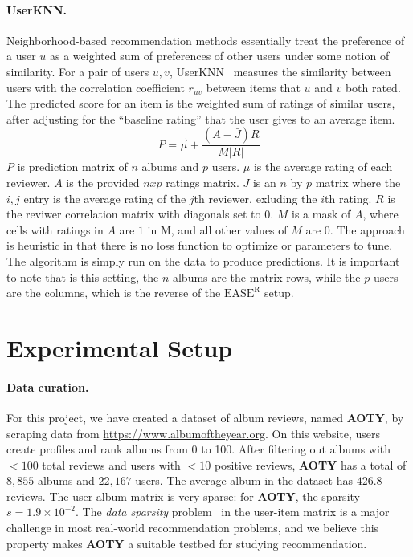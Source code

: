 \documentclass{article}
\newcommand{\aoty}{{\bf AOTY}\xspace}
\newcommand{\card}[1]{\ensuremath{\lvert {#1} \rvert}}
\newcommand{\easer}{$\text{EASE}^\text{R}$}
\newcommand{\userknn}{UserKNN\xspace}
\begin{document}
\paragraph*{\userknn.}
Neighborhood-based recommendation methods essentially treat the preference of a
 user $u$ as a weighted sum of preferences of other users under some notion of
 similarity.
For a pair of users $u, v$,
 \userknn~\citep{resnickGroupLensOpenArchitecture1994} measures the similarity
 between users with the correlation coefficient $r_{uv}$ between items that $u$
 and $v$ both rated.
The predicted score for an item is the weighted sum of ratings of similar
 users, after adjusting for the ``baseline rating'' that the user gives to an
 average item.
\begin{equation}
P = \vec{\mu} + \frac{(A - \bar J)R}{M \card{R}} \end{equation}  $P$ is
 prediction matrix of $n$ albums and $p$ users.
$\mu$ is the average
rating
of each reviewer. $A$ is the provided $nxp$ ratings matrix. $\bar J$ is an $n$
by $p$
matrix where the $i,j$ entry is the average rating of the $j$th reviewer,
exluding the $i$th
rating. $R$ is the reviwer correlation matrix with diagonals set to 0. $M$ is
a mask of
$A$, where cells with ratings in $A$ are $1$ in M, and all other values of $M$
are 0.
The approach is heuristic in that there is no loss function to optimize or
 parameters to tune.
The algorithm is simply run on the data to produce predictions.
It is important to note that is this setting, the $n$ albums are the matrix
 rows, while the $p$ users are the columns, which is the reverse of the \easer
 setup.

\section{Experimental Setup}
\label{sec:setup}
\paragraph*{Data curation.}
For this project, we have created a dataset of album reviews, named \aoty, by
 scraping data from \url{https://www.albumoftheyear.org}.
On this website, users create profiles and rank albums from 0 to 100.
After filtering out albums with $<100$ total reviews and users with $<10$
 positive reviews, \aoty has a total of $8,855$ albums and $22,167$ users.
The average album in the dataset has $426.8$ reviews.
The user-album matrix is very sparse: for \aoty, the sparsity $s = 1.9 \times
	 10^{-2}$.
The {\em data sparsity} problem~\citep{suSurveyCollaborativeFiltering2009} in
 the user-item matrix is a major challenge in most real-world recommendation
 problems, and we believe this property makes \aoty a suitable testbed for
 studying recommendation.
\end{document}
